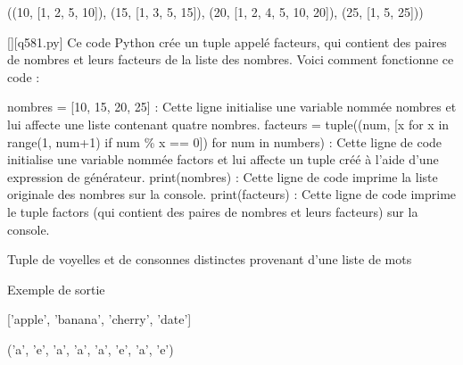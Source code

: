((10, [1, 2, 5, 10]), (15, [1, 3, 5, 15]), (20, [1, 2, 4, 5, 10, 20]), (25, [1, 5, 25]))
        \par
        \begin{solution}
            \renewcommand{\nomfichier}{q581.py}
            \pythonfile{\chemincode \nomfichier}[][\nomfichier]
            Ce code Python crée un tuple appelé facteurs, qui contient des paires de nombres et leurs facteurs de la liste des nombres. Voici comment fonctionne ce code :

    nombres = [10, 15, 20, 25] : Cette ligne initialise une variable nommée nombres et lui affecte une liste contenant quatre nombres.
    facteurs = tuple((num, [x for x in range(1, num+1) if num \% x == 0]) for num in numbers) : Cette ligne de code initialise une variable nommée factors et lui affecte un tuple créé à l'aide d'une expression de générateur.
    print(nombres) : Cette ligne de code imprime la liste originale des nombres sur la console.
    print(facteurs) : Cette ligne de code imprime le tuple factors (qui contient des paires de nombres et leurs facteurs) sur la console.
        \end{solution}
        

        \question
        Tuple de voyelles et de consonnes distinctes provenant d'une liste de mots

Exemple de sortie

['apple', 'banana', 'cherry', 'date']

('a', 'e', 'a', 'a', 'a', 'e', 'a', 'e')

